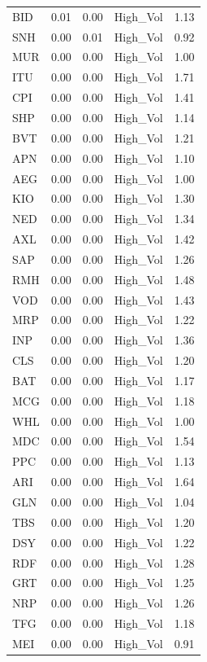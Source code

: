 \documentclass[11pt,preprint, authoryear]{elsarticle}
\numberwithin{equation}{section}
\numberwithin{figure}{section}
\numberwithin{table}{section}
\begin{document}
\begin{longtable}{lrrlr}
  BID & 0.01 & 0.00 & High\_Vol & 1.13 \\ 
  SNH & 0.00 & 0.01 & High\_Vol & 0.92 \\ 
  MUR & 0.00 & 0.00 & High\_Vol & 1.00 \\ 
  ITU & 0.00 & 0.00 & High\_Vol & 1.71 \\ 
  CPI & 0.00 & 0.00 & High\_Vol & 1.41 \\ 
  SHP & 0.00 & 0.00 & High\_Vol & 1.14 \\ 
  BVT & 0.00 & 0.00 & High\_Vol & 1.21 \\ 
  APN & 0.00 & 0.00 & High\_Vol & 1.10 \\ 
  AEG & 0.00 & 0.00 & High\_Vol & 1.00 \\ 
  KIO & 0.00 & 0.00 & High\_Vol & 1.30 \\ 
  NED & 0.00 & 0.00 & High\_Vol & 1.34 \\ 
  AXL & 0.00 & 0.00 & High\_Vol & 1.42 \\ 
  SAP & 0.00 & 0.00 & High\_Vol & 1.26 \\ 
  RMH & 0.00 & 0.00 & High\_Vol & 1.48 \\ 
  VOD & 0.00 & 0.00 & High\_Vol & 1.43 \\ 
  MRP & 0.00 & 0.00 & High\_Vol & 1.22 \\ 
  INP & 0.00 & 0.00 & High\_Vol & 1.36 \\ 
  CLS & 0.00 & 0.00 & High\_Vol & 1.20 \\ 
  BAT & 0.00 & 0.00 & High\_Vol & 1.17 \\ 
  MCG & 0.00 & 0.00 & High\_Vol & 1.18 \\ 
  WHL & 0.00 & 0.00 & High\_Vol & 1.00 \\ 
  MDC & 0.00 & 0.00 & High\_Vol & 1.54 \\ 
  PPC & 0.00 & 0.00 & High\_Vol & 1.13 \\ 
  ARI & 0.00 & 0.00 & High\_Vol & 1.64 \\ 
  GLN & 0.00 & 0.00 & High\_Vol & 1.04 \\ 
  TBS & 0.00 & 0.00 & High\_Vol & 1.20 \\ 
  DSY & 0.00 & 0.00 & High\_Vol & 1.22 \\ 
  RDF & 0.00 & 0.00 & High\_Vol & 1.28 \\ 
  GRT & 0.00 & 0.00 & High\_Vol & 1.25 \\ 
  NRP & 0.00 & 0.00 & High\_Vol & 1.26 \\ 
  TFG & 0.00 & 0.00 & High\_Vol & 1.18 \\ 
  MEI & 0.00 & 0.00 & High\_Vol & 0.91 \\ 

\end{longtable}
\end{document}

